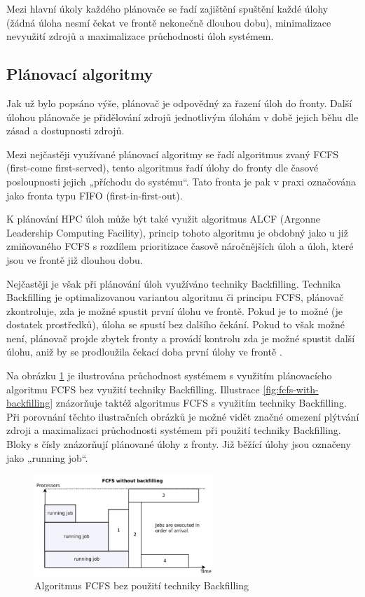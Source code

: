 Mezi hlavní úkoly každého plánovače se řadí zajištění spuštění každé úlohy (žádná úloha nesmí čekat ve frontě nekonečně dlouhou dobu), minimalizace nevyužití zdrojů a maximalizace průchodnosti úloh systémem.

\subsection{Plánovací algoritmy}
Jak už bylo popsáno výše, plánovač je odpovědný za řazení úloh do fronty. Další úlohou plánovače je přidělování zdrojů jednotlivým úlohám v době jejich běhu dle zásad a dostupnosti zdrojů. 

Mezi nejčastěji využívané plánovací algoritmy se řadí algoritmus zvaný FCFS (first-come first-served), tento algoritmus řadí úlohy do fronty dle časové posloupnosti jejich „příchodu do systému“. Tato fronta je pak v praxi označována jako fronta typu FIFO (first-in-first-out). 

K plánování HPC úloh může být také využit algoritmus ALCF (Argonne Leadership Computing Facility), princip tohoto algoritmu je obdobný jako u již zmiňovaného FCFS s rozdílem prioritizace časově náročnějších úloh a úloh, které jsou ve frontě již dlouhou dobu. 

Nejčastěji je však při plánování úloh využíváno techniky Backfilling. Technika Backfilling je optimalizovanou variantou algoritmu či principu FCFS, plánovač zkontroluje, zda je možné spustit první úlohu ve frontě. Pokud je to možné (je dostatek prostředků), úloha se spustí bez dalšího čekání. Pokud to však možné není, plánovač projde zbytek fronty a provádí kontrolu zda je možné spustit další úlohu, aniž by se prodloužila čekací doba první úlohy ve frontě \cite{pr00bfp79qnvRTQ3}.

Na obrázku \ref{fig:fcfs-without-backfilling} je ilustrována průchodnost systémem s využitím plánovacícho algoritmu FCFS bez využití techniky Backfilling. Illustrace \ref{fig:fcfs-with-backfilling} znázorňuje taktéž algoritmus FCFS s využitím techniky Backfilling. Při porovnání těchto ilustračních obrázků je možné vidět značné omezení plýtvání zdroji a maximalizaci průchodnosti systémem při použití techniky Backfilling. Bloky s čísly znázorňují plánované úlohy z fronty. Již běžící úlohy jsou označeny jako „running job“.
\newpage
\begin{figure}
	\centering
	\includegraphics[width=0.6\textwidth]{Figures/fcfs-without-backfilling.png}
	\caption{Algoritmus FCFS bez použití techniky Backfilling \cite{GomezMartin2016}}
	\label{fig:fcfs-without-backfilling}
\end{figure}

